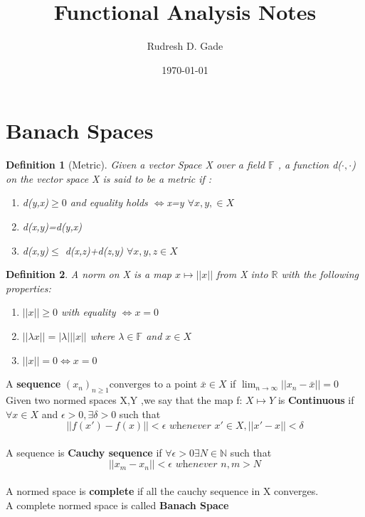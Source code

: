 \documentclass{article}
\newtheorem{definition}{Definition}[section]
\begin{document}
\title{Functional Analysis Notes}
\author{Rudresh D. Gade}
\date{\today}
\maketitle
\tableofcontents
\newpage

\section{Banach Spaces}
\begin{definition}[Metric]
    Given a vector Space X over a field $\mathbb{F}$  , a function d($\cdot, \cdot$) on the vector space X is said to be a metric if :
    \begin{enumerate}
        \item d(y,x)$\geq 0$ and equality holds $\Longleftrightarrow$x=y $\forall x,y, \in X$
        \item d(x,y)=d(y,x)
        \item d(x,y)$\leq$ d(x,z)+d(z,y) $\forall x,y,z \in X$
        
    \end{enumerate}
\end{definition}

\begin{definition}
    A norm on X is a map $x\mapsto ||x||$ from X into $\mathbb{R} $  with the following properties:
    \begin{enumerate}
        \item $||x||\geq 0$ with equality $\iff x=0$ 
        \item $||\lambda x||=|\lambda| ||x||$ where $\lambda \in \mathbb{F}$ and $x\in X $
        \item $||x|| =0 \Longleftrightarrow x=0$
    \end{enumerate}

\end{definition}
A \textbf{sequence} $(x_n)_{n \geq 1}  $converges to a point $\bar{x} \in X $ if $\lim_{n \to \infty} ||x_n - \bar{x}|| = 0  $
\\
Given  two normed spaces X,Y ,we say that the map f: $X \mapsto Y$ is \textbf{Continuous } if $\forall x \in X $ and $\epsilon >0, \exists \delta >0 $  such that  $$||f(x') - f(x)||<\epsilon \textit{   whenever   } x' \in X, ||x'-x||<\delta$$
\\
A sequence is \textbf{Cauchy sequence} if $\forall \epsilon>0 \exists N \in \mathbb{N}  $ such that $$ ||x_m-x_n||<\epsilon \textit{   whenever   }   n,m>N$$ 
\\
A normed space is \textbf{complete} if all the cauchy sequence in X converges.
\\A complete normed space is called \textbf{Banach Space}
\end{document}
